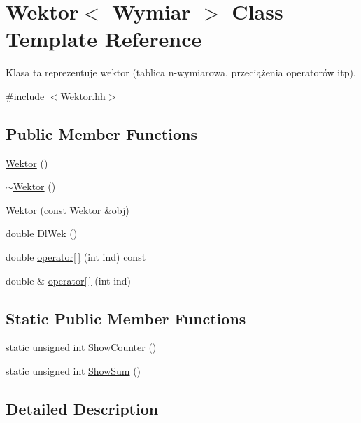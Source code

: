 \hypertarget{class_wektor}{}\section{Wektor$<$ Wymiar $>$ Class Template Reference}
\label{class_wektor}


Klasa ta reprezentuje wektor (tablica n-\/wymiarowa, przeciążenia operatorów itp).  




{\ttfamily \#include $<$Wektor.\+hh$>$}

\subsection*{Public Member Functions}
\begin{DoxyCompactItemize}
\item 
\hyperlink{class_wektor_acfa7e8deeb9dacb94d3c3d13b1f23d8f}{Wektor} ()
\item 
\hyperlink{class_wektor_a08017a99d115b17957e728d5ac2dc432}{$\sim$\+Wektor} ()
\item 
\hyperlink{class_wektor_a59c95ec1db1b090e29c5cd867953929a}{Wektor} (const \hyperlink{class_wektor}{Wektor} \&obj)
\item 
double \hyperlink{class_wektor_a49964f91d93ff53bd4152665fd93e57d}{Dl\+Wek} ()
\item 
double \hyperlink{class_wektor_a49876d44218344c450fe9e13d9c7e885}{operator\mbox{[}$\,$\mbox{]}} (int ind) const
\item 
double \& \hyperlink{class_wektor_a88d91e6a337390c1e6ab527970c392a4}{operator\mbox{[}$\,$\mbox{]}} (int ind)
\end{DoxyCompactItemize}
\subsection*{Static Public Member Functions}
\begin{DoxyCompactItemize}
\item 
static unsigned int \hyperlink{class_wektor_a438c6da633a43e609467e22b6e2079db}{Show\+Counter} ()
\item 
static unsigned int \hyperlink{class_wektor_a5365d8d93dfaa304c7fbd998e92660b7}{Show\+Sum} ()
\end{DoxyCompactItemize}


\subsection{Detailed Description}

